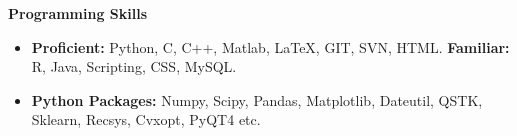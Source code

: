 \documentclass[letterpaper,9pt]{article}
\newcommand{\resheading}[1]{{ \colorbox{mygrey}{\begin{minipage}{\textwidth}{\textbf{#1 \vphantom{p\^{E}}}}\end{minipage}}}}
\begin{document}
\resheading{Programming Skills}
	\vspace{-13pt}
	\begin{itemize}
		\item{\textbf{Proficient: }\small Python, C, C++, Matlab, LaTeX, GIT, SVN, HTML. \hfill \textbf{Familiar: }\small R, Java, Scripting, CSS, MySQL. }
		\vspace{-6pt}
		\item{\textbf{Python Packages: }\small Numpy, Scipy, Pandas, Matplotlib, Dateutil, QSTK, Sklearn, Recsys, Cvxopt, PyQT4 etc. }
	\end{itemize} %
\end{document}
